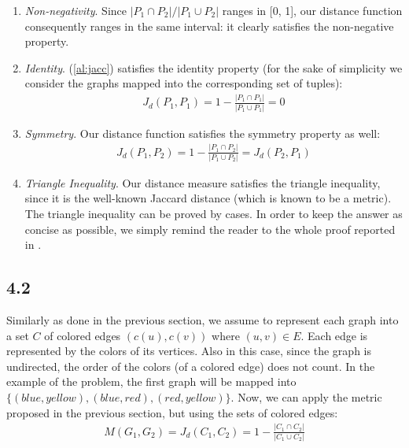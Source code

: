 \documentclass[12pt,a4paper]{article}
\begin{document}
\begin{description}
\begin{enumerate}
\item \textit{Non-negativity}. Since $ |P_1 \cap P_2| / |P_1 \cup P_2|$ ranges in [0, 1], our distance function consequently ranges in the same interval: it clearly satisfies the non-negative property.
\item \textit{Identity}. (\ref{al:jacc}) satisfies the identity property (for the sake of simplicity we consider the graphs mapped into the corresponding set of tuples):
\begin{align}
J_d(P_1, P_1) = 1 - \frac{|P_1 \cap P_1|}{|P_1 \cup P_1|} = 0
\end{align}
\item \textit{Symmetry}. Our distance function satisfies the symmetry property as well:
\begin{align}
J_d(P_1, P_2) = 1 - \frac{|P_1 \cap P_2|}{|P_1 \cup P_2|} = J_d(P_2, P_1)
\end{align}
\item \textit{Triangle Inequality}. Our distance measure satisfies the triangle inequality, since it is the well-known Jaccard distance (which is known to be a metric). The triangle inequality can be proved by cases. In order to keep the answer as concise as possible, we simply remind the reader to the whole proof reported in \cite{lipkus1999proof}.
\end{enumerate}


\end{description}


\subsection*{4.2}



Similarly as done in the previous section, we assume to represent each graph into a set $C$ of colored edges $(c(u), c(v))$ where $(u, v) \in E$. Each edge is represented by the colors of its vertices. Also in this case, since the graph is undirected, the order of the colors (of a colored edge) does not count. In the example of the problem, the first graph will be mapped into $\{(blue, yellow), (blue, red), (red, yellow)\}$. Now, we can apply the metric proposed in the previous section, but using the sets of colored edges:
\begin{align}\label{al:jacc2}
M(G_1, G_2) = J_d(C_1, C_2) = 1 - \frac{|C_1 \cap C_2|}{|C_1 \cup C_2|}
\end{align}
\end{document}
